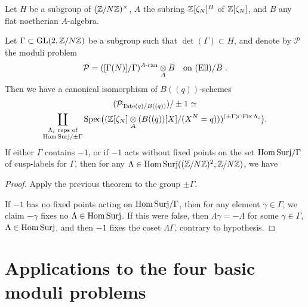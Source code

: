 \begin{kcor}\label{cor:10.8.3}
Let $H$ be a subgroup of $(\mathbb{Z}/N\mathbb{Z})^\times$, $A$ the subring $\mathbb{Z}[\zeta_N]^H$ of $\mathbb{Z}[\zeta_N]$, and $B$ any flat noetherian $A$-algebra.

Let $\Gamma \subset \operatorname{GL}(2,\mathbb{Z}/N\mathbb{Z})$ be a subgroup such that $\det(\Gamma) \subset H$, and denote by $\mathcal{P}$ the moduli problem
\[
\mathcal{P} = ([\Gamma(N)]/\Gamma)^{A\text{-can}} \underset{A}{\otimes} B \quad\text{on } (\mathrm{Ell})/B \; .
\]
Then we have a canonical isomorphism of $B((q))$-schemes
\begin{gather*}
(\mathcal{P}_{\mathrm{Tate}(q)/B((q))})/\pm 1 \simeq \\
\coprod_{\substack{\Lambda_i\ \text{reps of}\\ \mathrm{Hom\,Surj}/\pm\Gamma}}
\operatorname{Spec}\bigl((\mathbb{Z}[\zeta_N] \underset{A}{\otimes} (B((q))[X]/(X^N = q)))^{(\pm\Gamma) \cap \operatorname{Fix} \Lambda_i}\bigr) .
\end{gather*}
If either $\Gamma$ contains $-1$, or if $-1$ acts without fixed points on the set $\mathrm{Hom\,Surj}/\Gamma$ of cusp-labels for $\Gamma$, then for any $\Lambda \in \mathrm{Hom\,Surj}((\mathbb{Z}/N\mathbb{Z})^2, \mathbb{Z}/N\mathbb{Z})$, we have
\end{kcor}

\begin{proof}
Apply the previous theorem to the group $\pm\Gamma$.

If $-1$ has no fixed points acting on $\mathrm{Hom\,Surj}/\Gamma$, then for any element $\gamma \in \Gamma$, we claim $-\gamma$ fixes no $\Lambda \in \mathrm{Hom\,Surj}$. If this were false, then $\Lambda\gamma = -\Lambda$ for some $\gamma \in \Gamma$, $\Lambda \in \mathrm{Hom\,Surj}$, and then $-1$ fixes the coset $\Lambda\Gamma$, contrary to hypothesis.
\end{proof}

\section{Applications to the four basic moduli problems}
\label{sec:10.9}

